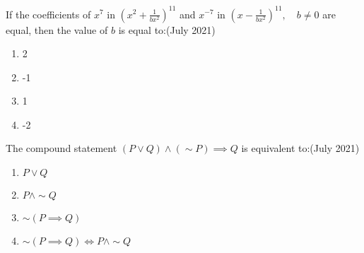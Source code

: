 \item
If the coefficients of $ x^7 $ in $\left( x^2 + \frac{1}{bx^2} \right)^{11}$ and $ x^{-7} $ in  $\left( x - \frac{1}{bx^2} \right)^{11}, \quad b \neq 0$
are equal, then the value of $ b $ is equal to:\hfill{(July 2021)}
\begin{enumerate}
    \item 2
    \item -1
    \item 1
    \item -2
\end{enumerate}
\item The compound statement $(P\vee Q)\wedge(\sim P)\implies Q$ is equivalent to:\hfill{(July 2021)}
\begin{enumerate}
    \item $P\vee Q$
    \item $P \wedge \sim Q$
    \item $\sim (P \implies Q)$
    \item $\sim (P\implies Q)\Leftrightarrow P \wedge \sim Q$
\end{enumerate}
 
